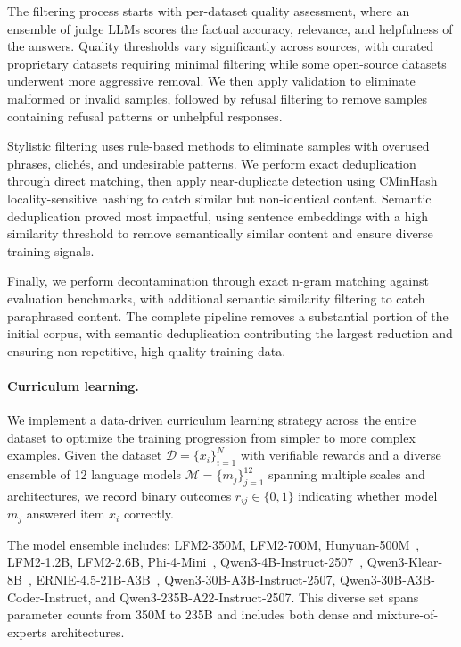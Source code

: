 \documentclass{article}
\begin{document}
The filtering process starts with per-dataset quality assessment, where an ensemble of judge LLMs scores the factual accuracy, relevance, and helpfulness of the answers. Quality thresholds vary significantly across sources, with curated proprietary datasets requiring minimal filtering while some open-source datasets underwent more aggressive removal. We then apply validation to eliminate malformed or invalid samples, followed by refusal filtering to remove samples containing refusal patterns or unhelpful responses.

Stylistic filtering uses rule-based methods to eliminate samples with overused phrases, clichés, and undesirable patterns. We perform exact deduplication through direct matching, then apply near-duplicate detection using CMinHash locality-sensitive hashing to catch similar but non-identical content. Semantic deduplication proved most impactful, using sentence embeddings with a high similarity threshold to remove semantically similar content and ensure diverse training signals.

Finally, we perform decontamination through exact n-gram matching against evaluation benchmarks, with additional semantic similarity filtering to catch paraphrased content. The complete pipeline removes a substantial portion of the initial corpus, with semantic deduplication contributing the largest reduction and ensuring non-repetitive, high-quality training data.

\paragraph{Curriculum learning.} We implement a data-driven curriculum learning strategy across the entire dataset to optimize the training progression from simpler to more complex examples. Given the dataset $\mathcal{D} = \{x_i\}_{i=1}^N$ with verifiable rewards and a diverse ensemble of 12 language models $\mathcal{M} = \{m_j\}_{j=1}^{12}$ spanning multiple scales and architectures, we record binary outcomes $r_{ij} \in \{0,1\}$ indicating whether model $m_j$ answered item $x_i$ correctly.

The model ensemble includes: LFM2-350M, LFM2-700M, Hunyuan-500M~\citep{sun2024hunyuanlargeopensourcemoemodel}, LFM2-1.2B, LFM2-2.6B, Phi-4-Mini~\citep{abouelenin2025phi}, Qwen3-4B-Instruct-2507~\citep{yang2025qwen3}, Qwen3-Klear-8B~\citep{Klear-thinking}, ERNIE-4.5-21B-A3B~\citep{ernie2025technicalreport}, Qwen3-30B-A3B-Instruct-2507, Qwen3-30B-A3B-Coder-Instruct, and Qwen3-235B-A22-Instruct-2507. This diverse set spans parameter counts from 350M to 235B and includes both dense and mixture-of-experts architectures.
\end{document}
